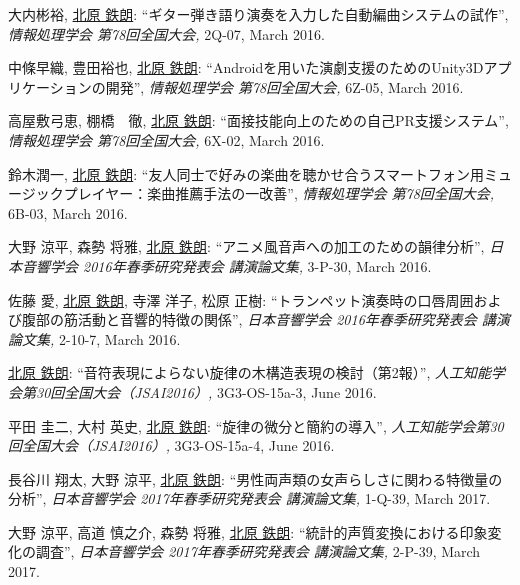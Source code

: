 \begin{Enumerate}
\item 
大内彬裕, 
\underline{北原 鉄朗}: 
    ``ギター弾き語り演奏を入力した自動編曲システムの試作'', 
    {\it 情報処理学会 第78回全国大会,
    } 2Q-07, March 2016. 

\item 
中條早織, 
豊田裕也, 
\underline{北原 鉄朗}: 
    ``Androidを用いた演劇支援のためのUnity3Dアプリケーションの開発'', 
    {\it 情報処理学会 第78回全国大会,
    } 6Z-05, March 2016. 

\item 
高屋敷弓恵, 
棚橋　徹, 
\underline{北原 鉄朗}: 
    ``面接技能向上のための自己PR支援システム'', 
    {\it 情報処理学会 第78回全国大会,
    } 6X-02, March 2016. 

\item 
鈴木潤一, 
\underline{北原 鉄朗}: 
    ``友人同士で好みの楽曲を聴かせ合うスマートフォン用ミュージックプレイヤー：楽曲推薦手法の一改善'', 
    {\it 情報処理学会 第78回全国大会,
    } 6B-03, March 2016. 

\item 
大野 涼平, 
森勢 将雅, 
\underline{北原 鉄朗}: 
    ``アニメ風音声への加工のための韻律分析'', 
    {\it 日本音響学会 2016年春季研究発表会 講演論文集,
    } 3-P-30, March 2016. 

\item 
佐藤 愛, 
\underline{北原 鉄朗}, 
寺澤 洋子, 
松原 正樹: 
    ``トランペット演奏時の口唇周囲および腹部の筋活動と音響的特徴の関係'', 
    {\it 日本音響学会 2016年春季研究発表会 講演論文集,
    } 2-10-7, March 2016. 

\item 
\underline{北原 鉄朗}: 
    ``音符表現によらない旋律の木構造表現の検討（第2報）'', 
    {\it 人工知能学会第30回全国大会（JSAI2016）,
    } 3G3-OS-15a-3, June 2016. 

\item 
平田 圭二, 
大村 英史, 
\underline{北原 鉄朗}: 
    ``旋律の微分と簡約の導入'', 
    {\it 人工知能学会第30回全国大会（JSAI2016）,
    } 3G3-OS-15a-4, June 2016. 

\item 
長谷川 翔太, 
大野 涼平, 
\underline{北原 鉄朗}: 
    ``男性両声類の女声らしさに関わる特徴量の分析'', 
    {\it 日本音響学会 2017年春季研究発表会 講演論文集,
    } 1-Q-39, March 2017. 

\item 
大野 涼平, 
高道 慎之介, 
森勢 将雅, 
\underline{北原 鉄朗}: 
    ``統計的声質変換における印象変化の調査'', 
    {\it 日本音響学会 2017年春季研究発表会 講演論文集,
    } 2-P-39, March 2017. 


\end{Enumerate}
